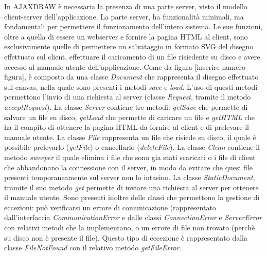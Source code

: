 In AJAXDRAW \`e necessaria la presenza di una parte server, visto il modello client-server dell'applicazione. La parte server, ha funzionalit\`a minimali, ma fondamentali per permettere il funzionamento dell'intero sistema. Le sue funzioni, oltre a quella di essere un webserver e fornire la pagina HTML al client, sono esclusivamente quelle di permettere un salvataggio in formato SVG del disegno effettuato sul client, effettuare il caricamento di un file risiedente su disco e avere accesso al manuale utente dell'applicazione. Come da figura [inserire numero figura], \`e composto da una classe \textit{Document} che rappresenta il disegno effettuato sul canvas, nella quale sono presenti i metodi \textit{save} e \textit{load}. L'uso di questi metodi permettono l'invio di una richiesta al server (classe \textit{Request}, tramite il metodo \textit{acceptRequest}). La classe \textit{Server} contiene tre metodi: \textit{getSave} che permette di salvare un file su disco, \textit{getLoad} che permette di caricare un file e \textit{getHTML} che ha il compito di ottenere la pagina HTML da fornire al client e di prelevare il manuale utente. La classe \textit{File} rappresenta un file che risiede su disco, il quale \`e possibile prelevarlo (\textit{getFile}) o cancellarlo (\textit{deleteFile}). La classe \textit{Clean} contiene il metodo \textit{sweeper} il quale elimina i file che sono gia stati scaricati o i file di client che abbandonano la connessione con il server, in modo da evitare che quesi file presenti temporaneamente sul server non lo intasino. La classe \textit{StaticDocument}, tramite il suo metodo \textit{get} permette di inviare una richiesta al server per ottenere il manuale utente. Sono presenti inoltre delle classi che permettono la gestione di eccezioni: può verificarsi un errore di comunicazione (rappresentato dall'interfaccia \textit{CommunicationError} e dalle classi \textit{ConnectionError} e \textit{ServerError} con relativi metodi che la implementano, o un errore di file non trovato (perch\`e su disco non \`e presente il file). Questo tipo di eccezione \`e rappresentato dalla classe \textit{FileNotFound} con il relativo metodo \textit{getFileError}. 



